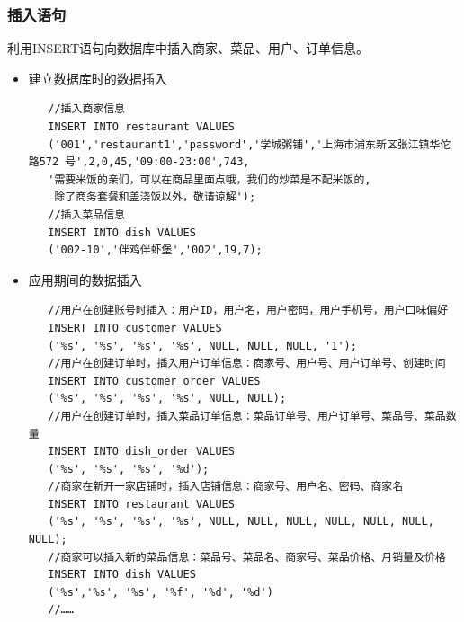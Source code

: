 \documentclass[12pt, oneside,a4paper]{article}
\begin{document}
\subsubsection{插入语句}
利用INSERT语句向数据库中插入商家、菜品、用户、订单信息。
  \begin{itemize}
   \item 建立数据库时的数据插入
    \begin{lstlisting}
   //插入商家信息
   INSERT INTO restaurant VALUES
   ('001','restaurant1','password','学城粥铺','上海市浦东新区张江镇华佗路572 号',2,0,45,'09:00-23:00',743,
   '需要米饭的亲们，可以在商品里面点哦，我们的炒菜是不配米饭的,
    除了商务套餐和盖浇饭以外，敬请谅解');
   //插入菜品信息
   INSERT INTO dish VALUES
   ('002-10','伴鸡伴虾堡','002',19,7);
    \end{lstlisting}
   \item 应用期间的数据插入
    \begin{lstlisting}
   //用户在创建账号时插入：用户ID，用户名，用户密码，用户手机号，用户口味偏好
   INSERT INTO customer VALUES
   ('%s', '%s', '%s', '%s', NULL, NULL, NULL, '1');
   //用户在创建订单时，插入用户订单信息：商家号、用户号、用户订单号、创建时间
   INSERT INTO customer_order VALUES
   ('%s', '%s', '%s', '%s', NULL, NULL);
   //用户在创建订单时，插入菜品订单信息：菜品订单号、用户订单号、菜品号、菜品数量
   INSERT INTO dish_order VALUES
   ('%s', '%s', '%s', '%d');
   //商家在新开一家店铺时，插入店铺信息：商家号、用户名、密码、商家名
   INSERT INTO restaurant VALUES
   ('%s', '%s', '%s', '%s', NULL, NULL, NULL, NULL, NULL, NULL, NULL);
   //商家可以插入新的菜品信息：菜品号、菜品名、商家号、菜品价格、月销量及价格
   INSERT INTO dish VALUES
   ('%s','%s', '%s', '%f', '%d', '%d')
   //……
    \end{lstlisting}
  \end{itemize}
\end{document}

